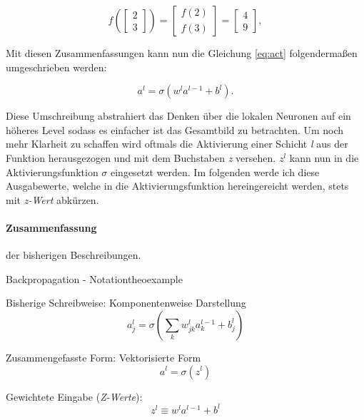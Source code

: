\begin{equation}
  f\left(\left[ \begin{array}{c} 2 \\ 3 \end{array} \right] \right)
  = \left[ \begin{array}{c} f(2) \\ f(3) \end{array} \right]
  = \left[ \begin{array}{c} 4 \\ 9 \end{array} \right],
\end{equation}

Mit diesen Zusammenfassungen kann nun die Gleichung \ref{eq:act} folgendermaßen umgeschrieben werden:

\begin{equation}
  a^{l} = \sigma(w^l a^{l-1}+b^l).
\end{equation}

Diese Umschreibung abstrahiert das Denken über die lokalen Neuronen auf ein höheres Level sodass es einfacher ist das Gesamtbild zu betrachten. Um noch mehr Klarheit zu schaffen wird oftmals die Aktivierung einer Schicht \emph{l} aus der Funktion herausgezogen und mit dem Buchstaben \emph{z} versehen. $z^l$ kann nun in die Aktivierungsfunktion $\sigma$ eingesetzt werden. Im folgenden werde ich diese Ausgabewerte, welche in die Aktivierungsfunktion hereingereicht werden, stets mit \emph{z-Wert} abkürzen.

\paragraph{Zusammenfassung} der bisherigen Beschreibungen.

\begin{mytheo}{Backpropagation - Notation}{theoexample}

Bisherige Schreibweise: Komponentenweise Darstellung
\begin{equation}
  a^{l}_j = \sigma\left( \sum_k w^{l}_{jk} a^{l-1}_k + b^l_j \right) \nonumber
\end{equation}

Zusammengefasste Form: Vektorisierte Form
\begin{equation} \label{eq:zusForm}
a^l = \sigma(z^l)
\end{equation}

Gewichtete Eingabe (\emph{Z-Werte}):
\begin{equation} \label{eq:gewEin}
  z^l \equiv w^l a^{l-1}+b^l
\end{equation}

\end{mytheo}

